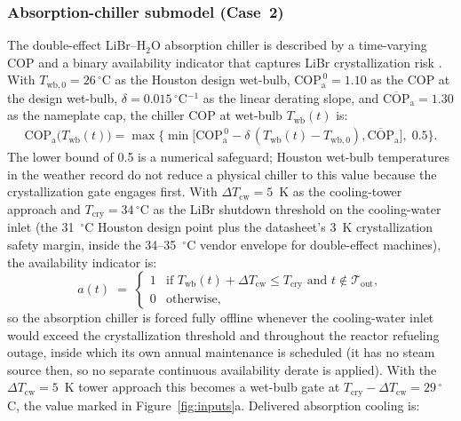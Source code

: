 \documentclass[a4paper,fleqn]{cas-sc}
\begin{document}
\subsubsection{Absorption-chiller submodel (Case~2)}
The double-effect LiBr--H$_2$O absorption chiller is described by a time-varying COP and a binary availability indicator that captures LiBr crystallization risk \citep{srikhirin2001absorption,herold2016absorption}. With $T_\mathrm{wb,0}=26\,^\circ$C as the Houston design wet-bulb, $\mathrm{COP}_\mathrm{a}^{\,0}=1.10$ as the COP at the design wet-bulb, $\delta=0.015\,^\circ$C$^{-1}$ as the linear derating slope, and $\overline{\mathrm{COP}}_\mathrm{a}=1.30$ as the nameplate cap, the chiller COP at wet-bulb $T_\mathrm{wb}(t)$ is:
\begin{equation}
\label{eq:cop_abs}
\begin{aligned}
\mathrm{COP}_\mathrm{a}\!\big(T_\mathrm{wb}(t)\big) =
\max\Big\{
  \min\big[\mathrm{COP}_\mathrm{a}^{\,0}
  - \delta\,(T_\mathrm{wb}(t)-T_\mathrm{wb,0}),
 \overline{\mathrm{COP}}_\mathrm{a}\big],\; 0.5\Big\}.
\end{aligned}
\end{equation}
The lower bound of 0.5 is a numerical safeguard; Houston wet-bulb temperatures in the weather record do not reduce a physical chiller to this value because the crystallization gate engages first. With $\Delta T_\mathrm{cw}=5$~K as the cooling-tower approach and $T_\mathrm{cry}=34\,^\circ$C as the LiBr shutdown threshold on the cooling-water inlet (the 31~$^\circ$C Houston design point plus the datasheet's 3~K crystallization safety margin, inside the 34--35~$^\circ$C vendor envelope for double-effect machines), the availability indicator is:
\begin{equation}
\label{eq:abs_avail}
a(t) \;=\; \begin{cases} 1 & \text{if } T_\mathrm{wb}(t) + \Delta T_\mathrm{cw} \le T_\mathrm{cry} \text{ and } t \notin \mathcal{T}_\mathrm{out}, \\ 0 & \text{otherwise}, \end{cases}
\end{equation}
so the absorption chiller is forced fully offline whenever the cooling-water inlet would exceed the crystallization threshold and throughout the reactor refueling outage, inside which its own annual maintenance is scheduled (it has no steam source then, so no separate continuous availability derate is applied). With the $\Delta T_\mathrm{cw}=5$~K tower approach this becomes a wet-bulb gate at $T_\mathrm{cry}-\Delta T_\mathrm{cw}=29\,^\circ$C, the value marked in Figure~\ref{fig:inputs}a. Delivered absorption cooling is:
\end{document}
